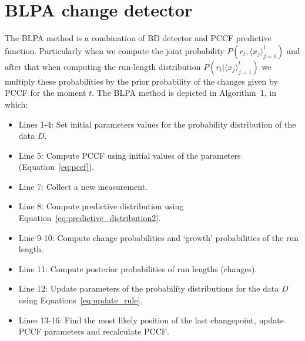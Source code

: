 \section{BLPA change detector}
\label{sec:BLPA}
The BLPA method is a combination of BD detector and PCCF predictive function.
Particularly when we compute the joint probability $P(r_t, \langle x_j \rangle_{j=1}^{t})$
and after that when computing the run-length distribution
$P(r_t | \langle x_j \rangle_{j=1}^{t})$
we multiply these probabilities by the prior probability of the
changes given by PCCF for the moment $t$.
%
The BLPA method is depicted in Algorithm~1, %
in which:
%
\begin{itemize}
    \item Lines 1-4: Set initial parameters values for the probability distribution of the data $D$.

    \item Line 5: Compute PCCF using initial values of the
        parameters (Equation~\ref{eq:pccf}).

    \item Line 7: Collect a new measurement.

    \item Line 8: Compute predictive distribution using Equation~\ref{eq:predictive_distribution2}.

    \item Line 9-10: Compute change probabilities and `growth' probabilities of the run length.

    \item Line 11: Compute posterior probabilities of run lengths (changes).

    \item Line 12: Update parameters of the probability distributions for the data $D$ using Equations~\ref{eq:update_rule}.

    \item Lines 13-16: Find the most likely position of the last changepoint, update PCCF parameters and recalculate PCCF.
\end{itemize}

%


